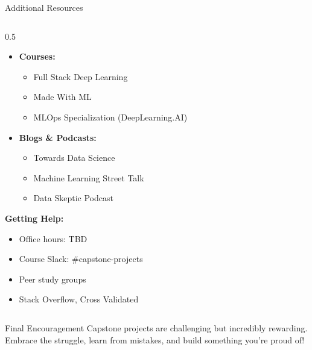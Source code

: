 \begin{frame}{Additional Resources}
\begin{columns}
\begin{column}{0.5\textwidth}
\begin{itemize}
\item \textbf{Courses:}
   \begin{itemize}
   \item Full Stack Deep Learning
   \item Made With ML
   \item MLOps Specialization (DeepLearning.AI)
   \end{itemize}

\item \textbf{Blogs \& Podcasts:}
   \begin{itemize}
   \item Towards Data Science
   \item Machine Learning Street Talk
   \item Data Skeptic Podcast
   \end{itemize}
\end{itemize}

\vspace{0.3cm}

\textbf{Getting Help:}
\begin{itemize}
\item Office hours: TBD
\item Course Slack: \#capstone-projects
\item Peer study groups
\item Stack Overflow, Cross Validated
\end{itemize}
\end{column}
\end{columns}

\vspace{0.3cm}

\begin{alertblock}{Final Encouragement}
Capstone projects are challenging but incredibly rewarding. Embrace the struggle, learn from mistakes, and build something you're proud of!
\end{alertblock}
\end{frame}


